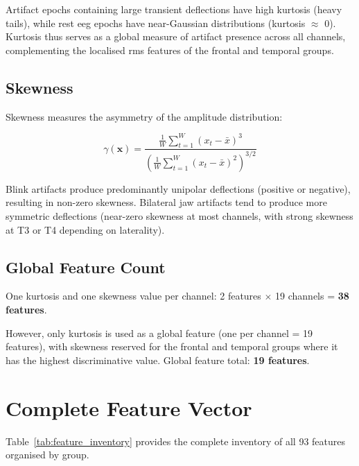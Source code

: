 Artifact epochs containing large transient deflections have
high kurtosis (heavy tails), while rest \acrshort{eeg}
epochs have near-Gaussian distributions (kurtosis
$\approx$ 0). Kurtosis thus serves as a global measure of
artifact presence across all channels, complementing the
localised \acrshort{rms} features of the frontal and
temporal groups.

\subsection{Skewness}

Skewness measures the asymmetry of the amplitude
distribution:

\begin{equation}
\gamma(\mathbf{x}) = \frac{\frac{1}{W}\sum_{t=1}^{W}
(x_t - \bar{x})^3}{\left(\frac{1}{W}\sum_{t=1}^{W}
(x_t - \bar{x})^2\right)^{3/2}}
\label{eq:skewness}
\end{equation}

Blink artifacts produce predominantly unipolar deflections
(positive or negative), resulting in non-zero skewness.
Bilateral jaw artifacts tend to produce more symmetric
deflections (near-zero skewness at most channels, with
strong skewness at T3 or T4 depending on laterality).

\subsection{Global Feature Count}

One kurtosis and one skewness value per channel:
2 features $\times$ 19 channels = \textbf{38 features}.

However, only kurtosis is used as a global feature (one
per channel = 19 features), with skewness reserved for
the frontal and temporal groups where it has the highest
discriminative value. Global feature total: \textbf{19
features}.

\section{Complete Feature Vector}
\label{sec:fe_summary_table}

Table~\ref{tab:feature_inventory} provides the complete
inventory of all 93 features organised by group.

